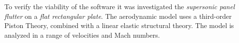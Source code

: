 To verify the viability of the software it was investigated the \emph{supersonic panel flutter}
on a \emph{flat rectangular plate}.
The aerodynamic  model uses a third-order Piston Theory, combined with a linear elastic structural theory.
The model is analyzed in a range of velocities and Mach numbers.